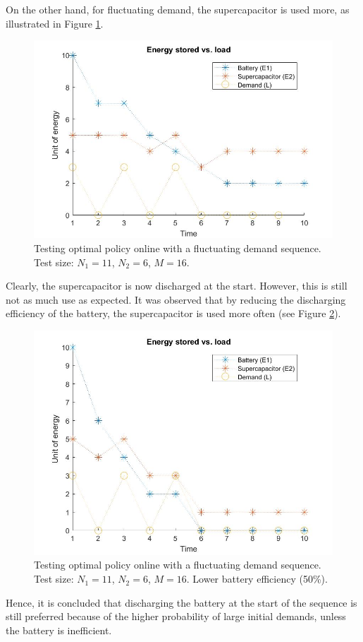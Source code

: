 \documentclass[conference]{IEEEtran}
\begin{document}
On the other hand, for fluctuating demand, the supercapacitor is used more, as illustrated in Figure \ref{fig:FluctuatingDemand}.
\begin{figure}[htbp]
\centerline{\includegraphics[scale=0.25]{EnergyStoredvsFluctuatingLoad(E1=10,E2=5).jpg}}
\caption{Testing optimal policy online with a fluctuating demand sequence. Test size: $N_{1}=11$, $N_{2}=6$, $M=16$.}
\label{fig:FluctuatingDemand}
\end{figure} Clearly, the supercapacitor is now discharged at the start. However, this is still not as much use as expected. It was observed that by reducing the discharging efficiency of the battery, the supercapacitor is used more often (see Figure \ref{fig:FluctuatingDemand_LowBattEff}).
\begin{figure}[htbp]
\centerline{\includegraphics[scale=0.25]{EnergyStoredvsFluctuatingLoad_LowBattEff(E1=10,E2=5).jpg}}
\caption{Testing optimal policy online with a fluctuating demand sequence. Test size: $N_{1}=11$, $N_{2}=6$, $M=16$. Lower battery efficiency (50\%).}
\label{fig:FluctuatingDemand_LowBattEff}
\end{figure} Hence, it is concluded that discharging the battery at the start of the sequence is still preferred because of the higher probability of large initial demands, unless the battery is inefficient.
\end{document}
